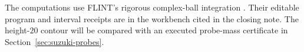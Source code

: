 The computations use FLINT's rigorous complex-ball integration
\cite[section ``Integration'']{flint-acb-calc}. Their editable
program and interval receipts are in the workbench cited in the
closing note. The height-$20$ contour will be compared with an
executed probe-mass certificate in Section~\ref{sec:suzuki-probes}.
